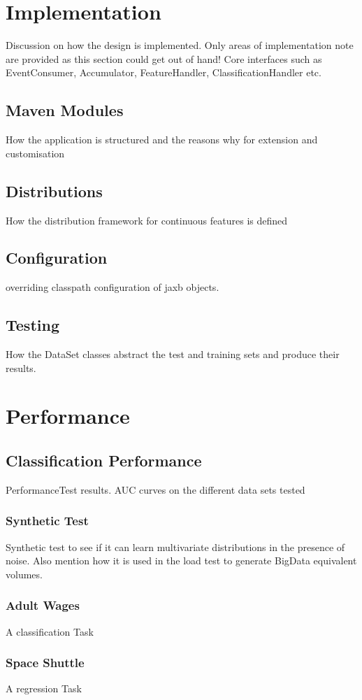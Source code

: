 \documentclass[a4paper,11pt]{scrreprt}
\begin{document}
\chapter{Implementation}
Discussion on how the design is implemented. Only areas of implementation note are provided as this section could get out of hand! Core interfaces such as EventConsumer, Accumulator, FeatureHandler, ClassificationHandler etc.
\section{Maven Modules}
How the application is structured and the reasons why for extension and customisation
\section{Distributions}
How the distribution framework for continuous features is defined 
\section{Configuration}
overriding classpath configuration of jaxb objects.
\section{Testing}
How the DataSet classes abstract the test and training sets and produce their results.
\chapter{Performance}
\section{Classification Performance}
PerformanceTest results. AUC curves on the different data sets tested
\subsection{Synthetic Test}
Synthetic test to see if it can learn multivariate distributions in the presence of noise. Also mention how it is used in the load test to generate BigData equivalent volumes.
\subsection{Adult Wages}
A classification Task
\subsection{Space Shuttle}
A regression Task
\end{document}
